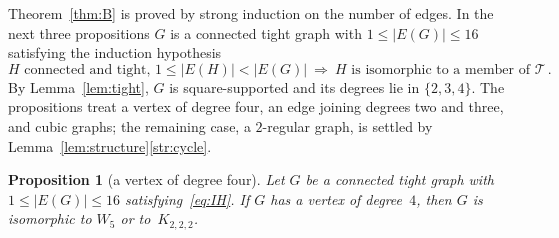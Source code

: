 \documentclass[11pt,letterpaper]{article}
\numberwithin{equation}{section}
\theoremstyle{plain}
\newtheorem{proposition}[theorem]{Proposition}
\theoremstyle{definition}
\theoremstyle{remark}
\newcommand{\Oct}{K_{2,2,2}}
\newcommand{\Tfam}{\mathcal{T}}
\begin{document}
Theorem~\ref{thm:B} is proved by strong induction on the number of edges. In the next three propositions $G$ is a connected tight graph with $1\le|E(G)|\le16$ satisfying the induction hypothesis
\begin{equation}\label{eq:IH}
H \text{ connected and tight, } 1\le|E(H)|<|E(G)| \ \Longrightarrow\ H \text{ is isomorphic to a member of } \Tfam\,.
\end{equation}
By Lemma~\ref{lem:tight}, $G$ is square-supported and its degrees lie in $\{2,3,4\}$. The propositions treat a vertex of degree four, an edge joining degrees two and three, and cubic graphs; the remaining case, a $2$-regular graph, is settled by Lemma~\ref{lem:structure}\ref{str:cycle}.

\begin{proposition}[a vertex of degree four]\label{prop:deg4}
Let $G$ be a connected tight graph with $1\le|E(G)|\le16$ satisfying~\eqref{eq:IH}. If $G$ has a vertex of degree~$4$, then $G$ is isomorphic to $W_5$ or to~$\Oct$.
\end{proposition}
\end{document}
